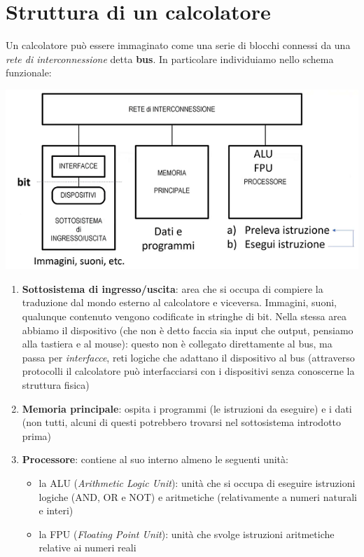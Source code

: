 \documentclass[11pt]{report}
\begin{document}
\section{Struttura di un calcolatore}
Un calcolatore può essere immaginato come una serie di blocchi connessi da una \emph{rete di interconnessione} detta \textbf{bus}. In particolare individuiamo nello schema funzionale:
\begin{center}
\includegraphics{img/1.PNG}
\end{center}
\begin{enumerate}
\item \textbf{Sottosistema di ingresso/uscita}: area che si occupa di compiere la traduzione dal mondo esterno al calcolatore e viceversa. Immagini, suoni, qualunque contenuto vengono codificate in stringhe di bit. Nella stessa area abbiamo il dispositivo (che non è detto faccia sia input che output, pensiamo alla tastiera e al mouse): questo non è collegato direttamente al bus, ma passa per \emph{interfacce}, reti logiche che adattano il dispositivo al bus (attraverso protocolli il calcolatore può interfacciarsi con i dispositivi senza conoscerne la struttura fisica)
\item \textbf{Memoria principale}: ospita i programmi (le istruzioni da eseguire) e i dati (non tutti, alcuni di questi potrebbero trovarsi nel sottosistema introdotto prima)
\item \textbf{Processore}: contiene al suo interno almeno le seguenti unità:
\begin{itemize}
\item la ALU (\emph{Arithmetic Logic Unit}): unità che si occupa di eseguire istruzioni logiche (AND, OR e NOT) e aritmetiche (relativamente a numeri naturali e interi)
\item la FPU (\emph{Floating Point Unit}): unità che svolge istruzioni aritmetiche relative ai numeri reali
\end{itemize}
\end{enumerate}
\end{document}
